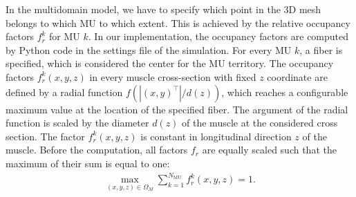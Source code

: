 In the multidomain model, we have to specify which point in the 3D mesh belongs to which MU to which extent. This is achieved by the relative occupancy factors $f_r^{k}$ for MU $k$.
In our implementation, the occupancy factors are computed by Python code in the settings file of the simulation. For every MU $k$, a fiber is specified, which is considered the center for the MU territory. The occupancy factors $f_r^k(x,y,z)$  in every muscle cross-section with fixed $z$ coordinate are defined by a radial function $f(|(x,y)^\top|/d(z))$, which reaches a configurable maximum value at the location of the specified fiber. The argument of the radial function is scaled by the diameter $d(z)$ of the muscle at the considered cross section. The factor $f_r^k(x,y,z)$ is constant in longitudinal direction $z$ of the muscle. Before the computation, all factors $f_r$ are equally scaled such that the maximum of their sum is equal to one:%
\begin{align*}
  \max\limits_{(x,y,z)\in\Omega_M} \sum_{k=1}^{N_\text{MU}} f_r^k(x,y,z) = 1.
\end{align*}

